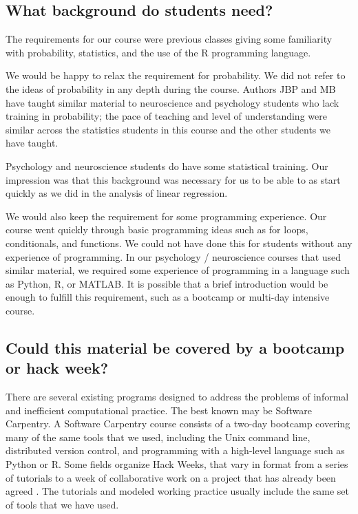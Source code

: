 \subsection{What background do students need?}

The requirements for our course were previous classes giving some familiarity
with probability, statistics, and the use of the R programming language.

We would be happy to relax the requirement for probability.  We did not refer
to the ideas of probability in any depth during the course.  Authors JBP and
MB have taught similar material to neuroscience and psychology students who
lack training in probability; the pace of teaching and level of understanding
were similar across the statistics students in this course and the other
students we have taught.

Psychology and neuroscience students do have some statistical training.  Our
impression was that this background was necessary for us to be able to as
start quickly as we did in the analysis of linear regression.

We would also keep the requirement for some programming experience.  Our
course went quickly through basic programming ideas such as for loops,
conditionals, and functions.  We could not have done this for students without
any experience of programming.  In our psychology / neuroscience courses that
used similar material, we required some experience of programming in a
language such as Python, R, or MATLAB.  It is possible that a brief
introduction would be enough to fulfill this requirement, such as a bootcamp
or multi-day intensive course.

\subsection{Could this material be covered by a bootcamp or hack week?}

There are several existing programs designed to address the problems
of informal and inefficient computational practice.  The best known may be
Software Carpentry\citep{wilson2014software}.  A Software Carpentry course
consists of a two-day bootcamp covering many of the same tools that we used,
including the Unix command line, distributed version control, and programming
with a high-level language such as Python or R. Some fields organize Hack
Weeks, that vary in format from a series of tutorials to a week of
collaborative work on a project that has already been agreed
\citep{huppenkothen_hack_2017}.  The tutorials and modeled working practice
usually include the same set of tools that we have used.

